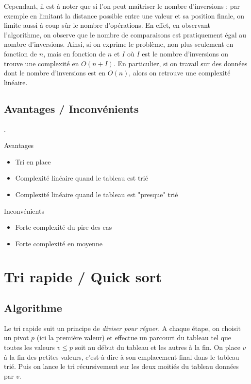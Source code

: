 \documentclass{../cours}
\begin{document}
Cependant, il est à noter que si l'on peut maîtriser le nombre d'inversions : par exemple en limitant la distance possible entre une valeur et sa position finale, on limite aussi à coup sûr le nombre d'opérations. En effet, en observant l'algorithme, on observe que le nombre de comparaisons est pratiquement égal au nombre d'inversions. Ainsi, si on exprime le problème, non plus seulement en fonction de $n$, mais en fonction de $n$ et $I$ où $I$ est le nombre d'inversions on trouve une complexité en $O(n +I)$. En particulier, si on travail sur des données dont le nombre d'inversions est en $O(n)$, alors on retrouve une complexité linéaire.

\subsection{Avantages / Inconvénients}

.

\begin{minipage}[t]{0.49 \textwidth}
Avantages

\begin{itemize}
\item Tri en place 
\item Complexité linéaire quand le tableau est trié
\item Complexité linéaire quand le tableau est "presque" trié
\end{itemize}

\end{minipage}
\begin{minipage}[t]{0.49 \textwidth}
Inconvénients

\begin{itemize}
\item Forte complexité du pire des cas
\item Forte complexité en moyenne
\end{itemize}

\end{minipage}

\section{Tri rapide / Quick sort}


\subsection{Algorithme}

Le tri rapide suit un principe de \textit{diviser pour régner}. A chaque étape, on choisit un pivot $p$ (ici la première valeur) et effectue un parcourt du tableau tel que toutes les valeurs $v \leq p$ soit au début du tableau et les autres à la fin. On place $v$ à la fin des petites valeurs, c'est-à-dire à son emplacement final dans le tableau trié. Puis on lance le tri récursivement sur les deux moitiés du tableau données par $v$.
\end{document}
